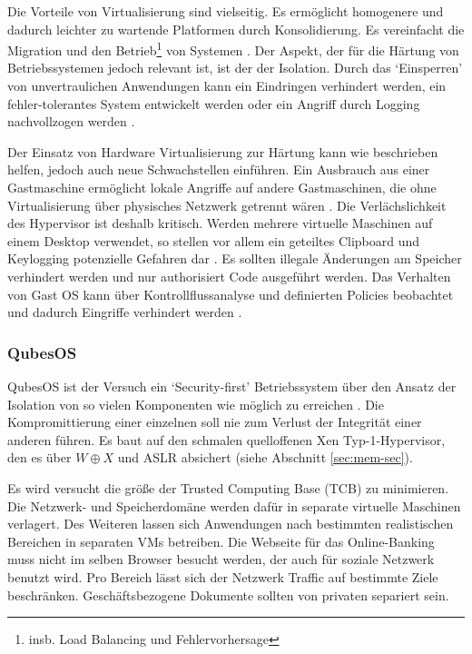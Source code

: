 Die Vorteile von Virtualisierung sind vielseitig. Es ermöglicht homogenere und dadurch leichter zu wartende Platformen durch Konsolidierung. Es vereinfacht die Migration und den Betrieb\footnote{insb. Load Balancing und Fehlervorhersage} von Systemen \cite{uhlig-intel}. Der Aspekt, der für die Härtung von Betriebssystemen jedoch relevant ist, ist der der Isolation. Durch das `Einsperren' von unvertraulichen Anwendungen kann ein Eindringen verhindert werden, ein fehler-tolerantes System
entwickelt werden \cite{terra} oder ein Angriff durch Logging nachvollzogen werden \cite{revirt}.

Der Einsatz von Hardware Virtualisierung zur Härtung kann wie beschrieben helfen, jedoch auch neue Schwachstellen einführen.
Ein Ausbrauch aus einer Gastmaschine ermöglicht lokale Angriffe auf andere Gastmaschinen, die ohne Virtualisierung über physisches Netzwerk getrennt wären \cite{svirt}. Die Verlächslichkeit des Hypervisor ist deshalb kritisch.
Werden mehrere virtuelle Maschinen auf einem Desktop verwendet, so stellen vor allem ein geteiltes Clipboard und Keylogging potenzielle Gefahren dar \cite{reuben}.
Es sollten illegale Änderungen am Speicher verhindert werden und nur authorisiert Code ausgeführt werden. Das Verhalten von Gast OS kann über Kontrollflussanalyse und definierten Policies beobachtet und dadurch Eingriffe verhindert werden \cite{christo}.

\subsubsection{QubesOS}

QubesOS ist der Versuch ein `Security-first' Betriebssystem über den Ansatz der Isolation von so vielen Komponenten wie möglich zu erreichen \cite{qubes}. Die Kompromittierung einer einzelnen soll nie zum Verlust der Integrität einer anderen führen.
Es baut auf den schmalen quelloffenen Xen Typ-1-Hypervisor, den es über $W \oplus X$ und ASLR absichert (siehe Abschnitt \ref{sec:mem-sec}).

Es wird versucht die größe der Trusted Computing Base (TCB) zu minimieren. Die Netzwerk- und Speicherdomäne werden dafür in separate virtuelle Maschinen verlagert. Des Weiteren lassen sich Anwendungen nach bestimmten realistischen
Bereichen in separaten VMs betreiben. Die Webseite für das Online-Banking muss nicht im selben Browser besucht werden, der auch für soziale Netzwerk benutzt wird. Pro Bereich lässt sich der Netzwerk Traffic auf bestimmte Ziele beschränken. Geschäftsbezogene Dokumente sollten von privaten separiert sein.

